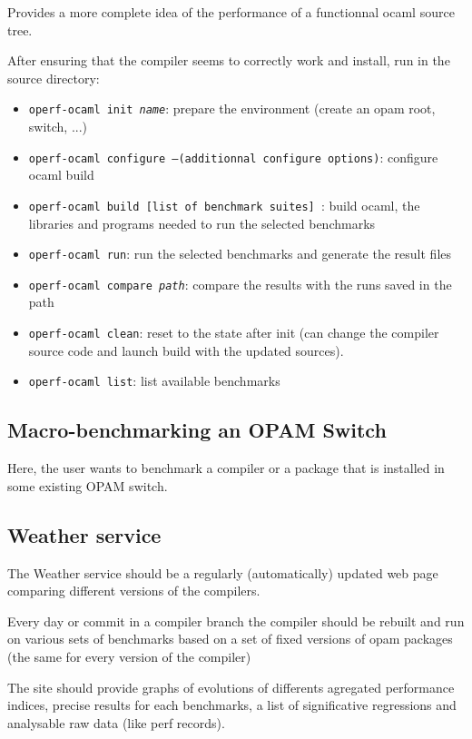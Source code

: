 \documentclass[11pt,a4paper]{article}
\begin{document}
Provides a more complete idea of the performance of a functionnal
ocaml source tree.

After ensuring that the compiler seems to correctly work and install,
run in the source directory:

\begin{itemize}
\item {\tt operf-ocaml init {\em name}}: prepare the environment (create an opam root, switch, ...)
\item {\tt operf-ocaml configure  --(additionnal configure options)}: configure ocaml build
\item {\tt operf-ocaml build [list of benchmark suites] }: build ocaml, the
  libraries and programs needed to run the selected benchmarks
\item {\tt operf-ocaml run}: run the selected benchmarks and generate the result files
\item {\tt operf-ocaml compare {\em path}}: compare the results with the runs saved in the path
\item {\tt operf-ocaml clean}: reset to the state after init (can change the compiler source code and launch build with the updated sources).
\item {\tt operf-ocaml list}: list available benchmarks
\end{itemize}

\subsection{Macro-benchmarking an OPAM Switch}

Here, the user wants to benchmark a compiler or a package that is
installed in some existing OPAM switch.

\subsection{Weather service}

The Weather service should be a regularly (automatically) updated web
page comparing different versions of the compilers.

Every day or commit in a compiler branch the compiler should be
rebuilt and run on various sets of benchmarks based on a set of fixed
versions of opam packages (the same for every version of the compiler)

The site should provide graphs of evolutions of differents agregated
performance indices, precise results for each benchmarks, a list of
significative regressions and analysable raw data (like perf records).
\end{document}
